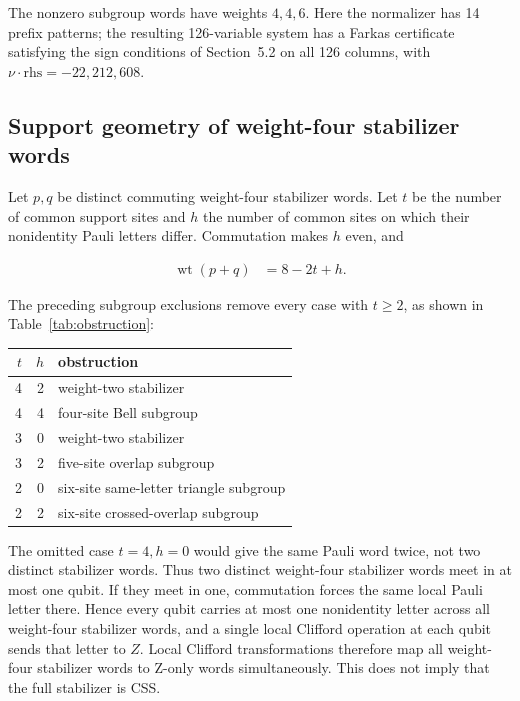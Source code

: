 \documentclass[11pt]{article}
\newcommand{\rhs}{\mathrm{rhs}}
\begin{document}
The nonzero subgroup words have weights \(4,4,6\). Here the normalizer has 14 prefix patterns; the resulting 126-variable system has a Farkas certificate satisfying the sign conditions of Section~5.2 on all 126 columns, with \(\nu \cdot \rhs=-22{,}212{,}608\).

\subsection{Support geometry of weight-four stabilizer words}\label{support-geometry-of-weight-four-checks}

Let \(p,q\) be distinct commuting weight-four stabilizer words. Let \(t\) be the number of common support sites and \(h\) the number of common sites on which their nonidentity Pauli letters differ. Commutation makes \(h\) even, and

\[
\begin{aligned}
\operatorname{wt}(p+q) &=8 - 2t + h.
\end{aligned}
\]

The preceding subgroup exclusions remove every case with \(t \geq 2\), as shown in Table~\ref{tab:obstruction}:

{\small
\setlength{\tabcolsep}{8pt}
\renewcommand{\arraystretch}{1.08}
\begin{center}
\label{tab:obstruction}
\begin{tabular}{@{}rrl@{}}
\toprule
\(t\) & \(h\) & obstruction \\
\midrule
4 & 2 & weight-two stabilizer \\
4 & 4 & four-site Bell subgroup \\
3 & 0 & weight-two stabilizer \\
3 & 2 & five-site overlap subgroup \\
2 & 0 & six-site same-letter triangle subgroup \\
2 & 2 & six-site crossed-overlap subgroup \\
\bottomrule
\end{tabular}
\end{center}
}

The omitted case \(t=4,h=0\) would give the same Pauli word twice, not two distinct stabilizer words. Thus two distinct weight-four stabilizer words meet in at most one qubit. If they meet in one, commutation forces the same local Pauli letter there. Hence every qubit carries at most one nonidentity letter across all weight-four stabilizer words, and a single local Clifford operation at each qubit sends that letter to \(Z\). Local Clifford transformations therefore map all weight-four stabilizer words to Z-only words simultaneously. This does not imply that the full stabilizer is CSS.
\end{document}
